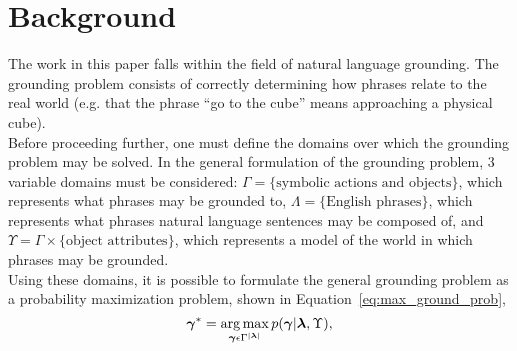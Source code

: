\section{Background}
\label{sec:background}
The work in this paper falls within the field of natural language grounding.
The grounding problem consists of correctly determining how phrases relate to the real world (e.g. that the phrase ``go to the cube'' means approaching a physical cube).\\
\indent Before proceeding further, one must define the domains over which the grounding problem may be solved.
In the general formulation of the grounding problem, 3 variable domains must be considered: $\Gamma = \{\text{symbolic actions and objects\}}$, which represents what phrases may be grounded to, $\Lambda = \{\text{English phrases}\}$, which represents what phrases natural language sentences may be composed of, and $\Upsilon = \Gamma \times \{\text{object attributes}\} $, which represents a model of the world in which phrases may be grounded.\\
\indent Using these domains, it is possible to formulate the general grounding problem as a probability maximization problem, shown in Equation~\ref{eq:max_ground_prob},
\begin{equation}
\boldsymbol{\gamma}^* = \operatorname*{\arg\max}_{\boldsymbol{\gamma} \epsilon \Gamma^{|\boldsymbol{\lambda}|}} p(\boldsymbol{\gamma}|\boldsymbol{\lambda},\Upsilon),
\label{eq:max_ground_prob}
\end{equation}

